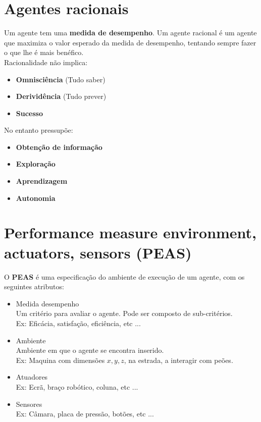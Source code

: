 \documentclass[]{report}
\begin{document}
\section{Agentes racionais}
Um agente tem uma \textbf{medida de desempenho}. Um agente racional é um agente que maximiza o valor esperado da medida de desempenho, tentando sempre fazer o que lhe é mais benéfico.\\[2mm]
Racionalidade não implica:
\begin{multicols}{3}
\begin{itemize}
\item \textbf{Omnisciência} (Tudo saber)
\item \textbf{Derividência} (Tudo prever)
\item \textbf{Sucesso}
\end{itemize}
\end{multicols}
\noindent No entanto pressupõe:
\begin{multicols}{2}
\begin{itemize}
\item \textbf{Obtenção de informação}
\item \textbf{Exploração}
\item \textbf{Aprendizagem}
\item \textbf{Autonomia}
\end{itemize}
\end{multicols}
\section{Performance measure environment, actuators, sensors (PEAS)}
O \textbf{PEAS} é uma especificação do ambiente de execução de um agente, com os seguintes atributos:
\begin{itemize}
	\item Medida desempenho\\
	Um critério para avaliar o agente. Pode ser composto de sub-critérios.\\
	Ex: Eficácia, satisfação, eficiência, etc ...
	\item Ambiente\\
	Ambiente em que o agente se encontra inserido.\\
	Ex: Maquina com dimensões $x, y, z$, na estrada, a interagir com peões.
	\item Atuadores\\
	Ex: Ecrã, braço robótico, coluna, etc ...
	\item Sensores\\
	Ex: Câmara, placa de pressão, botões, etc ...
\end{itemize}
\clearpage
\end{document}
